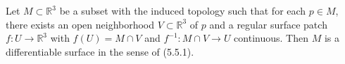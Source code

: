 Let $M \subset \mathbb{R}^3$ be a subset with the induced topology such that for each $p \in M$, there exists an open neighborhood $V \subset \mathbb{R}^3$ of $p$ and a regular surface patch $f: U \to \mathbb{R}^3$ with $f(U) = M \cap V$ and $f^{-1}: M \cap V \to U$ continuous. Then $M$ is a differentiable surface in the sense of (5.5.1).